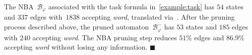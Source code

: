\begin{example}\label{eq:prune-nba}
The NBA~$\mathcal{B}_{\varphi}$ associated with the task formula in~\eqref{example:task}
has $54$ states and $337$ edges with~$1838$ accepting \emph{word},
translated via~\cite{gastin2001fast}.
After the pruning process described above, the pruned automaton~$\mathcal{B}^{-}_{\varphi}$
has $53$ states and $185$ edges with $240$ accepting \emph{word}. The NBA pruning step reduces $51\%$ edges and $86.9\%$
accepting \emph{word} without losing any information.
\hfill $\blacksquare$
\end{example}
